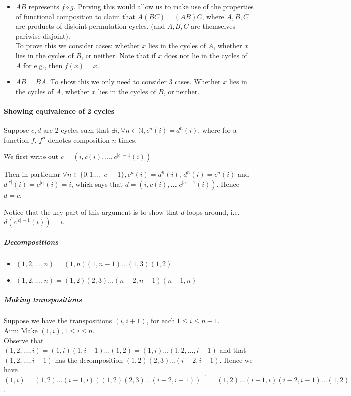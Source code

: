 \documentclass{article}
\begin{document}
\begin{itemize}
	\item $AB$ represents $f\circ g$. Proving this would allow us to make use of the properties of functional composition to claim that $A(BC)=(AB)C$, where $A,B,C$ are products of disjoint permutation cycles. (and $A,B,C$ are themselves pariwise disjoint).\\
	To prove this we consider cases: whether $x$ lies in the cycles of $A$, whether $x$ lies in the cycles of $B$, or neither. Note that if $x$ does not lie in the cycles of $A$ for e.g., then $f(x)=x$.
	\item $AB=BA$. To show this we only need to consider 3 cases. Whether $x$ lies in the cycles of $A$, whether $x$ lies in the cycles of $B$, or neither.
\end{itemize}

\paragraph{Showing equivalence of 2 cycles}

Suppose $c, d$ are 2 cycles such that $\exists i, \forall n\in \mathbb{N}, c^n(i) = d^n(i)$, where for a function $f$, $f^n$ denotes composition $n$ times.

We first write out $c = (i, c(i), \dots, c^{|c|-1}(i))$

Then in particular $\forall n\in \{0, 1\dots, |c|-1\}, c^n(i) = d^n(i)$, $d^n(i) = c^n(i)$ and $d^{|c|}(i) = c^{|c|}(i) = i$, which says that $d = (i, c(i), \dots, c^{|c|-1}(i))$. Hence $d=c$.

Notice that the key part of this argument is to show that $d$ loops around, i.e. $d(c^{|c|-1}(i)) = i$.

\subparagraph{Decompositions}
\begin{itemize}
	\item $(1,2,\dots,n) = (1,n)(1,n-1)\dots(1,3)(1,2)$
	\item $(1,2,\dots,n) = (1,2)(2,3)\dots(n-2,n-1)(n-1,n)$
\end{itemize}

\subparagraph{Making transpositions}
Suppose we have the transpositions $(i,i+1)$, for each $1\leq i\leq n-1$.\\
Aim: Make $(1,i), 1\leq i\leq n$.\\
Observe that $(1,2,\dots,i)=(1,i)(1,i-1)\dots(1,2)=(1,i)\dots(1,2,\dots,i-1)$ and that $(1,2,\dots,i-1)$ has the decomposition $(1,2)(2,3)\dots(i-2,i-1)$. Hence we have $(1,i) = (1,2)\dots(i-1,i)((1,2)(2,3)\dots(i-2,i-1))^{-1} = (1,2)\dots(i-1,i)(i-2,i-1)\dots(1,2)$.
\end{document}
